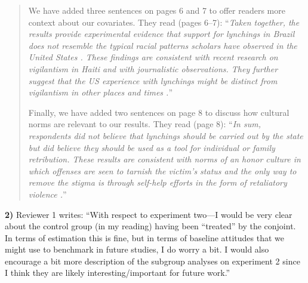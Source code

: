 \documentclass[a4paper,12pt]{article}
\begin{document}
\begin{quote}
We have added three sentences on pages 6 and 7 to offer readers more context
about our covariates. They read (pages 6--7): ``\textit{Taken together, the
  results provide experimental evidence that support for lynchings in Brazil
  does not resemble the typical racial patterns scholars have observed in the
  United States \citep{dray2003hands,obert2018keeping,seguin2019national}.
  These findings are consistent with recent research on vigilantism in Haiti
  \citep{jung2020lynching} and with journalistic observations. They further
  suggest that the US experience with lynchings might be distinct from
vigilantism in other places and times \citep{oliveira2016mob}.}'' 

Finally, we have added two sentences on page 8 to discuss how cultural norms
are relevant to our results. They read (page 8): ``\textit{In sum,
respondents did not believe that lynchings should be carried out by the state
but did believe they should be used as a tool for individual or family
retribution. These results are consistent with norms of an honor culture in
which offenses are seen to tarnish the victim's status and the only way to
remove the stigma is through self-help efforts in the form of retaliatory
violence \citep{nisbett2018culture}.}''

\end{quote}

\vspace{.3cm}

\noindent \textbf{2)} Reviewer 1 writes: ``With respect to experiment two---I
would be very clear about the control group (in my reading) having been
``treated'' by the conjoint. In terms of estimation this is fine, but in terms
of baseline attitudes that we might use to benchmark in future studies, I do
worry a bit.  I would also encourage a bit more description of the subgroup
analyses on experiment 2 since I think they are likely interesting/important
for future work.''

\vspace{.3cm}
\end{document}
